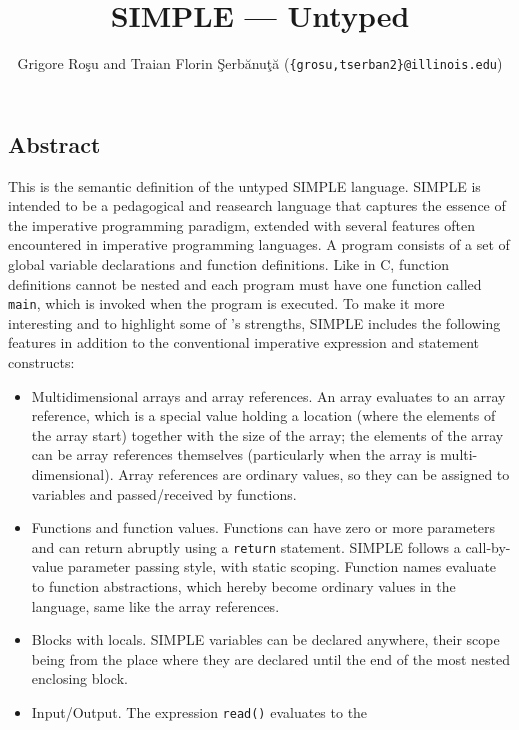 
\setlength{\parindent}{1em}
\title{SIMPLE --- Untyped}
\author{Grigore Ro\c{s}u and 
        Traian Florin \c{S}erb\u{a}nu\c{t}\u{a} (\texttt{\{grosu,tserban2\}@illinois.edu})}

\maketitle

\begin{kblock}[text]
\section{Abstract}
This is the \K semantic definition of the untyped SIMPLE language.
SIMPLE is intended to be a pedagogical and reasearch language that captures
the essence of the imperative programming paradigm, extended with several
features often encountered in imperative programming languages.
A program consists of a set of global variable declarations and
function definitions.  Like in C, function definitions cannot be
nested and each program must have one function called \texttt{main},
which is invoked when the program is executed.  To make it more
interesting and to highlight some of \K's strengths, SIMPLE includes
the following features in addition to the conventional imperative
expression and statement constructs:
\begin{itemize}
\item Multidimensional arrays and array references.  An array evaluates
to an array reference, which is a special value holding a location (where
the elements of the array start) together with the size of the array;
the elements of the array can be array references themselves (particularly
when the array is multi-dimensional).  Array references are ordinary values,
so they can be assigned to variables and passed/received by functions.
\item Functions and function values.  Functions can have zero or
more parameters and can return abruptly using a \texttt{return} statement.
SIMPLE follows a call-by-value parameter passing style, with static scoping.
Function names evaluate to function abstractions, which hereby become ordinary
values in the language, same like the array references.
\item Blocks with locals.  SIMPLE variables can be declared
anywhere, their scope being from the place where they are declared
until the end of the most nested enclosing block.
\item Input/Output.  The expression \texttt{read()} evaluates to the

\end{itemize}
\end{kblock}
